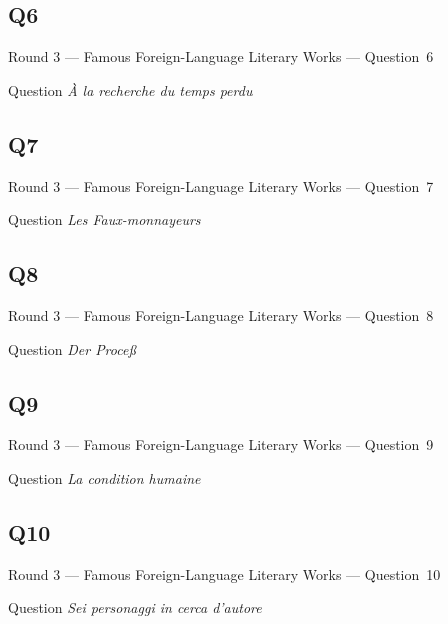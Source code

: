 \documentclass[11pt]{beamer}
\begin{document}
\subsection*{Q6}
\begin{frame}[t]{Round 3 --- Famous Foreign-Language Literary Works --- \mbox{Question 6}}
    \vspace{-0.5em}
    \begin{block}{Question}
        \emph{À la recherche du temps perdu}
    \end{block}
\end{frame}
\subsection*{Q7}
\begin{frame}[t]{Round 3 --- Famous Foreign-Language Literary Works --- \mbox{Question 7}}
    \vspace{-0.5em}
    \begin{block}{Question}
        \emph{Les Faux-monnayeurs}
    \end{block}
\end{frame}
\subsection*{Q8}
\begin{frame}[t]{Round 3 --- Famous Foreign-Language Literary Works --- \mbox{Question 8}}
    \vspace{-0.5em}
    \begin{block}{Question}
        \emph{Der Proce{\ss}}
    \end{block}
\end{frame}
\subsection*{Q9}
\begin{frame}[t]{Round 3 --- Famous Foreign-Language Literary Works --- \mbox{Question 9}}
    \vspace{-0.5em}
    \begin{block}{Question}
        \emph{La condition humaine}
    \end{block}
\end{frame}
\subsection*{Q10}
\begin{frame}[t]{Round 3 --- Famous Foreign-Language Literary Works --- \mbox{Question 10}}
    \vspace{-0.5em}
    \begin{block}{Question}
        \emph{Sei personaggi in cerca d'autore}
    \end{block}
\end{frame}
\end{document}
